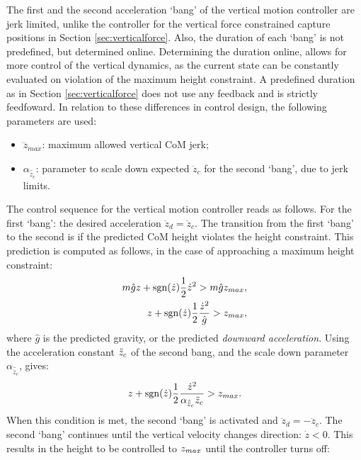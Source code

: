 The first and the second acceleration `bang' of the vertical motion controller are jerk limited, unlike the controller for the vertical force constrained capture positions in Section \ref{sec:verticalforce}. Also, the duration of each `bang' is not predefined, but determined online. Determining the duration online, allows for more control of the vertical dynamics, as the current state can be constantly evaluated on violation of the maximum height constraint. A predefined duration as in Section \ref{sec:verticalforce} does not use any feedback and is strictly feedfoward. In relation to these differences in control design, the following parameters are used:
\begin{itemize}
	\item $\dddot{z}_{max}$: maximum allowed vertical CoM jerk;
	\item $\alpha_{\hat{\ddot{z}}_{c}}$: parameter to scale down expected $\ddot{z}_c$ for the second `bang', due to jerk limits.
\end{itemize}
The control sequence for the vertical motion controller reads as follows. For the first `bang': the desired acceleration $\ddot{z}_d=\ddot{z}_c$. The transition from the first `bang' to the second is if the predicted \ac{CoM} height violates the height constraint. This prediction is computed as follows, in the case of approaching a maximum height constraint:
\begin{align}
	m\hat{g}z + \operatorname{sgn}(\dot{z})\frac{1}{2}\dot{z}^2>m\hat{g}z_{max},\\
	z + \operatorname{sgn}(\dot{z})\frac{1}{2}\frac{\dot{z}^2}{\hat{g}}>z_{max},
\end{align}
where $\hat{g}$ is the predicted gravity, or the predicted \textit{downward acceleration}. Using the acceleration constant $\ddot{z}_{c}$ of the second bang, and the scale down parameter $\alpha_{\hat{\ddot{z}}_{c}}$, gives:
\begin{equation}
	z+\operatorname{sgn}(\dot{z})\frac{1}{2}\frac{\dot{z}^2}{\alpha_{\hat{\ddot{z}}_{c}}\ddot{z}_{c}} >z_{max}.
\end{equation}
When this condition is met, the second `bang' is activated and $\ddot{z}_d=-\ddot{z}_c$. The second `bang' continues until the vertical velocity changes direction: $\dot{z}<0$. This results in the height to be controlled to $z_{max}$ until the controller turns off:
